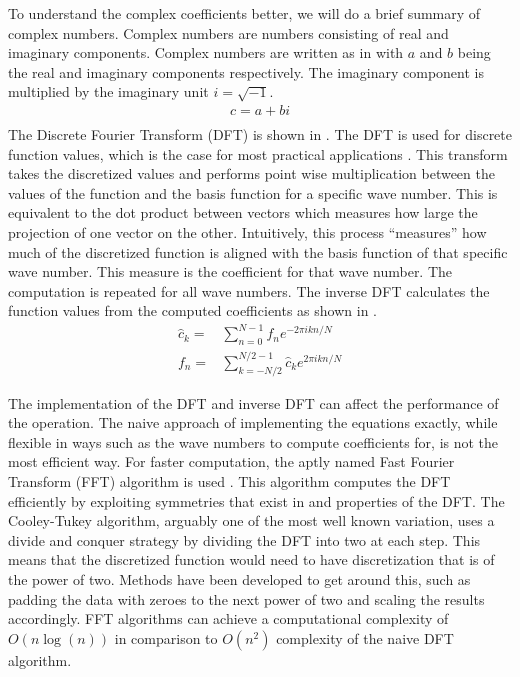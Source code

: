 To understand the complex coefficients better, we will do a brief summary of complex numbers. Complex numbers are numbers consisting of real and imaginary components. Complex numbers are written as in  with \(a \) and \(b \) being the real and imaginary components respectively. The imaginary component is multiplied by the imaginary unit \(i=\sqrt{-1}\).
\begin{align}
  c = a + bi \label{eq:complex_number} \\
\end{align}
The Discrete Fourier Transform (DFT) is shown in . The DFT is used for discrete function values, which is the case for most practical applications \autocite{smithMathematicsDiscreteFourier2007,mathworksDiscreteFourierTransform2024}. This transform takes the discretized values and performs point wise multiplication between the values of the function and the basis function for a specific wave number. This is equivalent to the dot product between vectors which measures how large the projection of one vector on the other. Intuitively, this process \enquote{measures} how much of the discretized function is aligned with the basis function of that specific wave number. This measure is the coefficient for that wave number. The computation is repeated for all wave numbers. The inverse DFT calculates the function values from the computed coefficients as shown in .
\begin{align}
  \hat{c}_k= & \sum_{n=0}^{N-1} f_n e^{-2\pi ikn/N} \label{eq:discrete_fourier_transform}                   \\
  f_n=       & \sum_{k=-N/2}^{N/2-1} \hat{c}_k e^{2\pi ikn/N} \label{eq:inverse_discrete_fourier_transform}
\end{align}

The implementation of the DFT and inverse DFT can affect the performance of the operation. The naive approach of implementing the equations exactly, while flexible in ways such as the wave numbers to compute coefficients for, is not the most efficient way. For faster computation, the aptly named Fast Fourier Transform (FFT) algorithm is used \autocite{chuFFTBlackBox2000}. This algorithm computes the DFT efficiently by exploiting symmetries that exist in and properties of the DFT\@. The Cooley-Tukey algorithm, arguably one of the most well known variation, uses a divide and conquer strategy by dividing the DFT into two at each step. This means that the discretized function would need to have discretization that is of the power of two. Methods have been developed to get around this, such as padding the data with zeroes to the next power of two and scaling the results accordingly. FFT algorithms can achieve a computational complexity of \(O(n\log(n))\) in comparison to \(O(n^2)\) complexity of the naive DFT algorithm.

